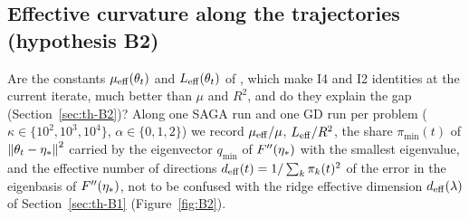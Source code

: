 \subsection{Effective curvature along the trajectories (hypothesis B2)}\label{sec:exp-B2}

Are the constants $\mu_{\mathrm{eff}}(\theta_t)$ and $L_{\mathrm{eff}}(\theta_t)$ of , which make I4 and I2 identities
at the current iterate, much better than $\mu$ and $R^2$, and do they explain the gap (Section~\ref{sec:th-B2})? Along one
SAGA run and one GD run per problem ($\kappa\in\{10^2,10^3,10^4\}$, $\alpha\in\{0,1,2\}$) we record $\mu_{\mathrm{eff}}/\mu$, $L_{\mathrm{eff}}/R^2$,
the share $\pi_{\min}(t)$ of $\left\|\theta_t-\eta_\ast\right\|^2$ carried by the eigenvector $q_{\min}$ of $F''(\eta_\ast)$ with the
smallest eigenvalue, and the effective number of directions $d_{\rm eff}(t)=1/\sum_k\pi_k(t)^2$ of the error in the
eigenbasis of $F''(\eta_\ast)$, not to be confused with the ridge effective dimension $d_{\rm eff}(\lambda)$ of
Section~\ref{sec:th-B1} (Figure~\ref{fig:B2}).

